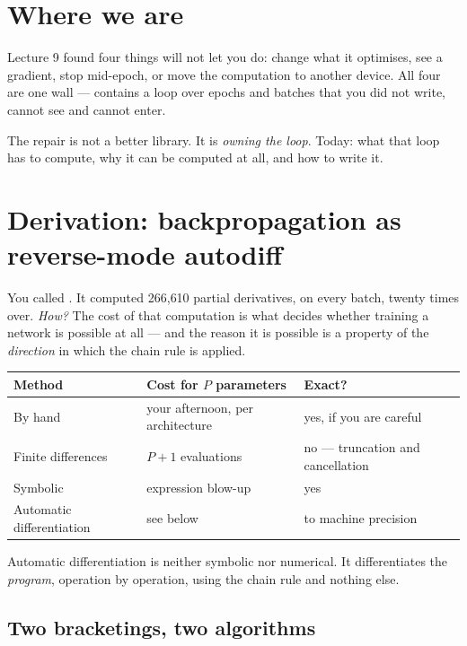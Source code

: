 \documentclass[11pt,a4paper]{article}
\begin{document}

\section{Where we are}

Lecture 9 found four things  will not let you do: change
what it optimises, see a gradient, stop mid-epoch, or move the computation to
another device. All four are one wall ---  contains a loop over
epochs and batches that you did not write, cannot see and cannot enter.

The repair is not a better library. It is \emph{owning the loop}. Today: what
that loop has to compute, why it can be computed at all, and how to write it.

\section{Derivation: backpropagation as reverse-mode autodiff}

You called . It computed 266{,}610 partial derivatives, on
every batch, twenty times over. \emph{How?} The cost of that computation is
what decides whether training a network is possible at all --- and the reason
it is possible is a property of the \emph{direction} in which the chain rule is
applied.

\begin{center}
\small
\begin{tabular}{llp{}}
\toprule
\textbf{Method} & \textbf{Cost for $P$ parameters} & \textbf{Exact?} \\
\midrule
By hand & your afternoon, per architecture & yes, if you are careful \\
Finite differences & $P+1$ evaluations & no --- truncation and cancellation \\
Symbolic & expression blow-up & yes \\
Automatic differentiation & see below & to machine precision \\
\bottomrule
\end{tabular}
\end{center}

Automatic differentiation is neither symbolic nor numerical. It differentiates
the \emph{program}, operation by operation, using the chain rule and nothing
else.

\subsection{Two bracketings, two algorithms}
\end{document}
